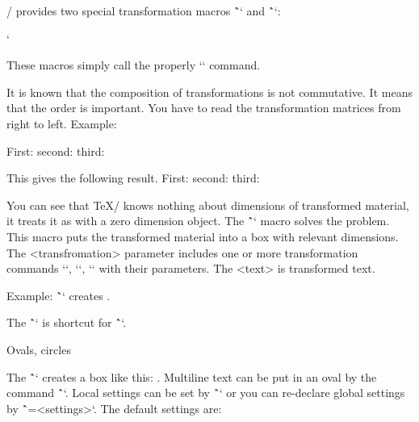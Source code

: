 {\OpTeX/ provides two special transformation macros
\^`\pdfscale` and \^`\pdfrotate`:

\begtt \catcode`
\endtt

These macros simply call the properly `\pdfsetmatrix` command.

It is known that the composition of transformations is not commutative. It
means that the order is important. You have to read the transformation
matrices from right to left. Example:

\begtt
First: \pdfsave {}\pdfrestore
second: \pdfsave {}\pdfrestore
third: \pdfsave {}%
       \pdfrestore %
\endtt
%
\par\nobreak\bigskip\smallskip
This gives the following result.
First: \pdfsave {}\pdfrestore
second: \pdfsave {}\pdfrestore
third: \pdfsave {}\pdfrestore
\par\nobreak\bigskip{}%

You can see that \TeX/ knows nothing about dimensions of transformed material,
it treats it as with a zero dimension object.
\new
The \^``
macro solves the problem. This macro puts the transformed
material into a box with relevant dimensions. The <transfromation> parameter
includes one or more transformation commands `\pdfsetmatrix`, `\pdfscale`,
`\pdfrotate` with their parameters. The <text> is transformed text.

Example: \~``
creates .

The \^`` is shortcut for
\^``.

\secc Ovals, circles

\new
The \^`` creates a box like this: .
Multiline text can be put in an oval by the command \^``.
Local settings can be set by
\^`` or you can re-declare global settings by
\^`\ovalparams={<settings>}`. The default settings are:

}
